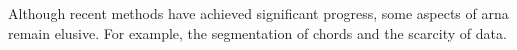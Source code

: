 

Although recent methods have achieved significant progress,
some aspects of \gls{arna} remain elusive. For example, the
segmentation of chords and the scarcity of data.
